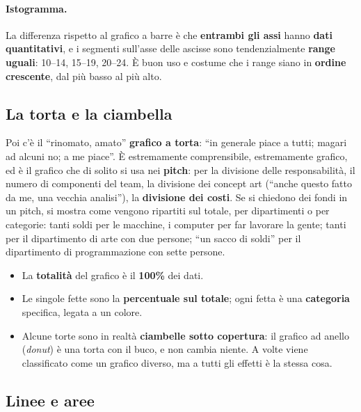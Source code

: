 \paragraph{Istogramma.} La differenza rispetto al grafico a barre è che
\textbf{entrambi gli assi} hanno \textbf{dati quantitativi}, e i segmenti
sull'asse delle ascisse sono tendenzialmente \textbf{range uguali}: 10--14,
15--19, 20--24. È buon uso e costume che i range siano in \textbf{ordine
crescente}, dal più basso al più alto.

\subsection{La torta e la ciambella}

Poi c'è il ``rinomato, amato'' \textbf{grafico a torta}: ``in generale piace a
tutti; magari ad alcuni no; a me piace''. È estremamente comprensibile,
estremamente grafico, ed è il grafico che di solito si usa nei
\textbf{pitch}: per la divisione delle responsabilità, il numero di componenti
del team, la divisione dei concept art (``anche questo fatto da me, una
vecchia analisi''), la \textbf{divisione dei costi}. Se si chiedono dei
fondi in un pitch, si mostra come vengono ripartiti sul totale, per
dipartimenti o per categorie: tanti soldi per le macchine, i computer per far
lavorare la gente; tanti per il dipartimento di arte con due persone; ``un
sacco di soldi'' per il dipartimento di programmazione con sette persone.
\begin{itemize}
  \item La \textbf{totalità} del grafico è il \textbf{100\%} dei dati.
  \item Le singole fette sono la \textbf{percentuale sul totale}; ogni fetta è
        una \textbf{categoria} specifica, legata a un colore.
  \item Alcune torte sono in realtà \textbf{ciambelle sotto copertura}: il
        grafico ad anello (\emph{donut}) è una torta con il buco, e non
        cambia niente. A volte viene classificato come un grafico diverso,
        ma a tutti gli effetti è la stessa cosa.
\end{itemize}

\subsection{Linee e aree}

